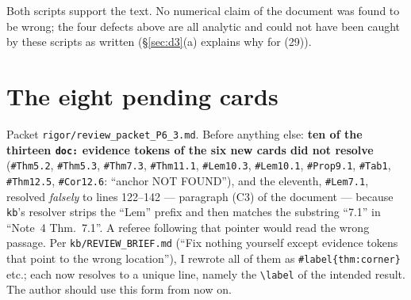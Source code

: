 \documentclass[11pt]{article}
\theoremstyle{definition}\newtheorem{example}[theorem]{Example}
\begin{document}
\begin{verdictok}
Both scripts support the text.  No numerical claim of the document was found to be wrong;
the four defects above are all analytic and could not have been caught by these scripts as
written (\S\ref{sec:d3}(a) explains why for (29)).
\end{verdictok}


\section{The eight pending cards}\label{sec:cards}

Packet \texttt{rigor/review\_packet\_P6\_3.md}.  Before anything else: \textbf{ten of the
thirteen \texttt{doc:} evidence tokens of the six new cards did not resolve}
(\texttt{\#Thm5.2}, \texttt{\#Thm5.3}, \texttt{\#Thm7.3}, \texttt{\#Thm11.1},
\texttt{\#Lem10.3}, \texttt{\#Lem10.1}, \texttt{\#Prop9.1}, \texttt{\#Tab1},
\texttt{\#Thm12.5}, \texttt{\#Cor12.6}: ``anchor NOT FOUND''), and the eleventh,
\texttt{\#Lem7.1}, resolved \emph{falsely} to lines 122--142 --- paragraph (C3) of the
document --- because \texttt{kb}'s resolver strips the ``Lem'' prefix and then matches the
substring ``7.1'' in ``Note~4 Thm.~7.1''.  A referee following that pointer would read the
wrong passage.  Per \texttt{kb/REVIEW\_BRIEF.md} (``Fix nothing yourself except evidence
tokens that point to the wrong location''), I rewrote all of them as
\texttt{\#label\{thm:corner\}} etc.; each now resolves to a unique line, namely the
\verb|\label| of the intended result.  The author should use this form from now on.
\end{document}
